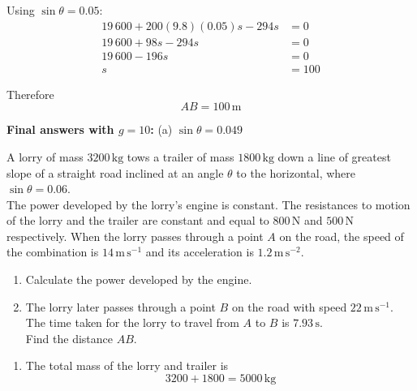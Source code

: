 \documentclass[leqno]{article}
\begin{document}
\begin{enumerate}[
  label=\textbf{\arabic*.},
  leftmargin=*,
  topsep=0pt,
  partopsep=0pt,
  parsep=0pt
]
\begin{djsSolution}
\begin{enumerate}[label=\textbf{(\alph*)}, start=1]
  Using \(\sin\theta = 0.05\):
  \begin{align*}
  19\,600 + 200(9.8)(0.05)s - 294s &= 0 \\
  19\,600 + 98s - 294s &= 0 \\
  19\,600 - 196s &= 0 \\
  s &= 100
  \end{align*}

  Therefore
  \[
  AB = 100\,\mathrm{m}
  \]
\end{enumerate}
\par\medskip\noindent\textbf{Final answers with \(g = 10\):} (a) \(\sin\theta = 0.049\)
\end{djsSolution}


\newpage

\questionitem

A lorry of mass $3200\,\mathrm{kg}$ tows a trailer of mass $1800\,\mathrm{kg}$ down a line of greatest slope of a straight road inclined at an angle $\theta$ to the horizontal, where $\sin\theta=0.06$. \\

The power developed by the lorry's engine is constant. The resistances to motion of the lorry and the trailer are constant and equal to $800\,\mathrm{N}$ and $500\,\mathrm{N}$ respectively. When the lorry passes through a point $A$ on the road, the speed of the combination is $14\,\mathrm{m\,s^{-1}}$ and its acceleration is $1.2\,\mathrm{m\,s^{-2}}$. \\

\begin{enumerate}[label=\textbf{(\alph*)}]
  \item Calculate the power developed by the engine.  \\
  \item The lorry later passes through a point $B$ on the road with speed $22\,\mathrm{m\,s^{-1}}$. The time taken for the lorry to travel from $A$ to $B$ is $7.93\,\mathrm{s}$. \\

  Find the distance $AB$.  \\
\end{enumerate}

\vspace*{10pt}

\begin{djsSolution}
\begin{enumerate}[label=\textbf{(\alph*)}, start=1]
  \item The total mass of the lorry and trailer is
  \[
  3200+1800=5000\,\mathrm{kg}
  \]


\end{enumerate}
\end{djsSolution}
\end{enumerate}
\end{document}
